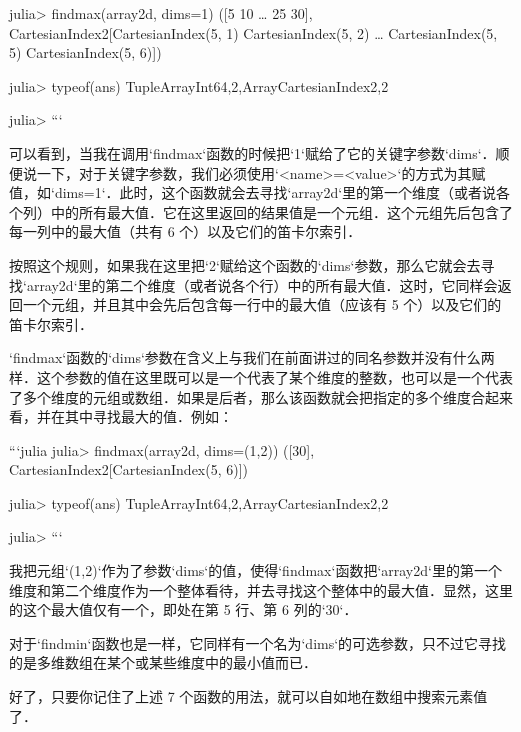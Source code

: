 julia> findmax(array2d, dims=1)
([5 10 … 25 30], CartesianIndex{2}[CartesianIndex(5, 1) CartesianIndex(5, 2) … CartesianIndex(5, 5) CartesianIndex(5, 6)])

julia> typeof(ans)
Tuple{Array{Int64,2},Array{CartesianIndex{2},2}}

julia> 
```

可以看到，当我在调用`findmax`函数的时候把`1`赋给了它的关键字参数`dims`．顺便说一下，对于关键字参数，我们必须使用`<name>=<value>`的方式为其赋值，如`dims=1`．此时，这个函数就会去寻找`array2d`里的第一个维度（或者说各个列）中的所有最大值．它在这里返回的结果值是一个元组．这个元组先后包含了每一列中的最大值（共有 6 个）以及它们的笛卡尔索引．

按照这个规则，如果我在这里把`2`赋给这个函数的`dims`参数，那么它就会去寻找`array2d`里的第二个维度（或者说各个行）中的所有最大值．这时，它同样会返回一个元组，并且其中会先后包含每一行中的最大值（应该有 5 个）以及它们的笛卡尔索引．

`findmax`函数的`dims`参数在含义上与我们在前面讲过的同名参数并没有什么两样．这个参数的值在这里既可以是一个代表了某个维度的整数，也可以是一个代表了多个维度的元组或数组．如果是后者，那么该函数就会把指定的多个维度合起来看，并在其中寻找最大的值．例如：

```julia
julia> findmax(array2d, dims=(1,2))
([30], CartesianIndex{2}[CartesianIndex(5, 6)])

julia> typeof(ans)
Tuple{Array{Int64,2},Array{CartesianIndex{2},2}}

julia> 
```

我把元组`(1,2)`作为了参数`dims`的值，使得`findmax`函数把`array2d`里的第一个维度和第二个维度作为一个整体看待，并去寻找这个整体中的最大值．显然，这里的这个最大值仅有一个，即处在第 5 行、第 6 列的`30`．

对于`findmin`函数也是一样，它同样有一个名为`dims`的可选参数，只不过它寻找的是多维数组在某个或某些维度中的最小值而已．

好了，只要你记住了上述 7 个函数的用法，就可以自如地在数组中搜索元素值了．